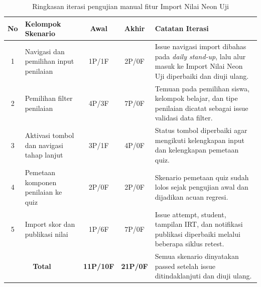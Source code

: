 \begin{table}[htbp]
	\centering
	\caption{Ringkasan iterasi pengujian manual fitur Import Nilai Neon Uji}
	\label{tab:ringkasan_pengujian_import_neon_uji}
	\begin{tabularx}{\textwidth}{|c|>{\raggedright\arraybackslash}p{3.7cm}|c|c|>{\raggedright\arraybackslash}X|}
		\hline
		\textbf{No}                          & \textbf{Kelompok Skenario}                & \textbf{Awal}   & \textbf{Akhir}                                                                  & \textbf{Catatan Iterasi}                                                                                                        \\
		\hline
		1                                    & Navigasi dan pemilihan input penilaian    & 1P/1F           & 2P/0F                                                                           & Issue navigasi import dibahas pada \textit{daily stand-up}, lalu alur masuk ke Import Nilai Neon Uji diperbaiki dan diuji ulang. \\
		\hline
		2                                    & Pemilihan filter penilaian                & 4P/3F           & 7P/0F                                                                           & Temuan pada pemilihan siswa, kelompok belajar, dan tipe penilaian dicatat sebagai issue validasi data filter.                   \\
		\hline
		3                                    & Aktivasi tombol dan navigasi tahap lanjut & 3P/1F           & 4P/0F                                                                           & Status tombol diperbaiki agar mengikuti kelengkapan input dan kelengkapan pemetaan quiz.                                        \\
		\hline
		4                                    & Pemetaan komponen penilaian ke quiz       & 2P/0F           & 2P/0F                                                                           & Skenario pemetaan quiz sudah lolos sejak pengujian awal dan dijadikan acuan regresi.                                            \\
		\hline
		5                                    & Import skor dan publikasi nilai           & 1P/6F           & 7P/0F                                                                           & Issue attempt, student, tampilan IRT, dan notifikasi publikasi diperbaiki melalui beberapa siklus retest.                       \\
		\hline
		\multicolumn{2}{|c|}{\textbf{Total}} & \textbf{11P/10F}                          & \textbf{21P/0F} & Semua skenario dinyatakan passed setelah issue ditindaklanjuti dan diuji ulang.                                                                                                                                   \\
		\hline
	\end{tabularx}
\end{table}

